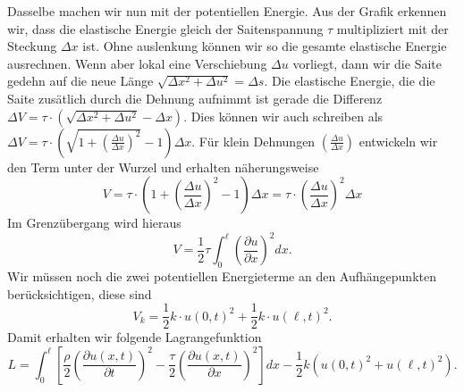 Dasselbe machen wir nun mit der potentiellen Energie. Aus der Grafik erkennen
wir, dass die elastische Energie gleich der Saitenspannung $\tau$ multipliziert
mit der Steckung $\Delta x$ ist. Ohne auslenkung können wir so die gesamte
elastische Energie ausrechnen. Wenn aber lokal eine Verschiebung $\Delta u$
vorliegt, dann wir die Saite gedehn auf die neue Länge $\sqrt{\Delta x^2+\Delta
u^2}=\Delta s$. Die elastische Energie, die die Saite zusätlich durch die
Dehnung aufnimmt ist gerade die Differenz $\Delta V=\tau\cdot(\sqrt{\Delta
x^2+\Delta u^2}-\Delta x)$. Dies können wir auch schreiben als $\Delta
V=\tau\cdot\left(\sqrt{1+\left(\frac{\Delta u}{\Delta
x}\right)^2}-1\right)\Delta x$. Für klein Dehnungen $\left(\frac{\Delta u}{\Delta
x}\right)$ entwickeln wir den Term unter der Wurzel und erhalten näherungsweise
\[
  V=\tau\cdot\left(1+\left(\frac{\Delta u}{\Delta x}\right)^2-1\right)\Delta x
  =\tau\cdot\left(\frac{\Delta u}{\Delta x}\right)^2\Delta x
\]
Im Grenzübergang wird hieraus
\begin{equation}
  V=\frac{1}{2}\tau\int_0^\ell\left(\frac{\partial u}{\partial x}\right)^2dx.
  \label{eq:Epot}
\end{equation}
Wir müssen noch die zwei potentiellen Energieterme an den Aufhängepunkten
berücksichtigen, diese sind
\begin{equation}
  V_k=\frac{1}{2}k\cdot u(0,t)^2 +\frac{1}{2}k\cdot u(\ell,t)^2.
  \label{eq:EpotSprings}
\end{equation}
Damit erhalten wir folgende Lagrangefunktion
\begin{equation}
  L=\int_0^\ell\left[
    \frac{\rho}{2}\left(\frac{\partial u(x,t)}{\partial t}\right)^2
   -\frac{\tau}{2}\left(\frac{\partial u(x,t)}{\partial x}\right)^2
 \right]dx-\frac{1}{2}k\left(u(0,t)^2 + u(\ell,t)^2\right).
  \label{eq:LagrangianSaite}
\end{equation}

